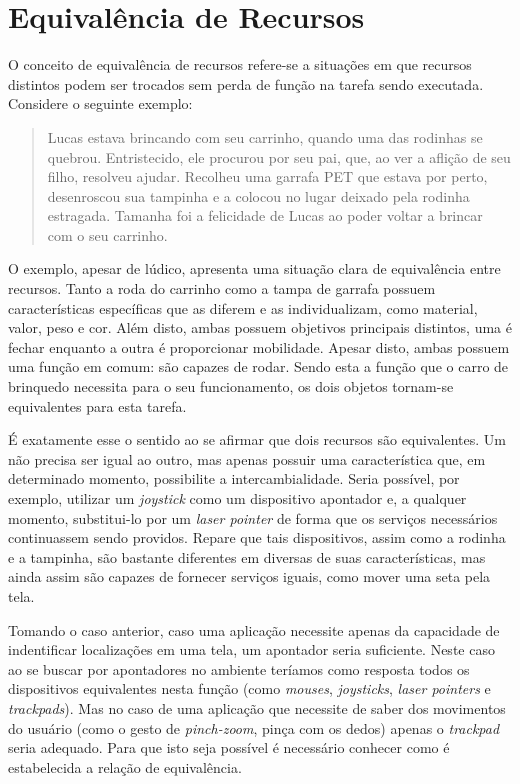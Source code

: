 \section{Equivalência de Recursos}
\label{sec:equivalenciaRecursos}

O conceito de equivalência de recursos refere-se a situações em que recursos distintos podem ser trocados sem perda de função na tarefa sendo executada. Considere o seguinte exemplo:

\begin{quote}
	Lucas estava brincando com seu carrinho, quando uma das rodinhas se quebrou. Entristecido, ele procurou por seu pai, que, ao ver a aflição de seu filho, resolveu ajudar. Recolheu uma garrafa PET que estava por perto, desenroscou sua tampinha e a colocou no lugar deixado pela rodinha estragada. Tamanha foi a felicidade de Lucas ao poder voltar a brincar com o seu carrinho.
\end{quote}

O exemplo, apesar de lúdico, apresenta uma situação clara de equivalência entre recursos. Tanto a roda do carrinho como a tampa de garrafa possuem características específicas que as diferem e as individualizam, como material, valor, peso e cor. Além disto, ambas possuem objetivos principais distintos, uma é fechar enquanto a outra é proporcionar mobilidade. Apesar disto, ambas possuem uma função em comum: são capazes de rodar. Sendo esta a função que o carro de brinquedo necessita para o seu funcionamento, os dois objetos tornam-se equivalentes para esta tarefa.

É exatamente esse o sentido ao se afirmar que dois recursos são equivalentes. Um não precisa ser igual ao outro, mas apenas possuir uma característica que, em determinado momento, possibilite a intercambialidade. Seria possível, por exemplo, utilizar um \emph{joystick} como um dispositivo apontador e, a qualquer momento, substitui-lo por um \emph{laser pointer} de forma que os serviços necessários continuassem sendo providos. Repare que tais dispositivos, assim como a rodinha e a tampinha, são bastante diferentes em diversas de suas características, mas ainda assim são capazes de fornecer serviços iguais, como mover uma seta pela tela.

Tomando o caso anterior, caso uma aplicação necessite apenas da capacidade de indentificar localizações em uma tela, um apontador seria suficiente. Neste caso ao se buscar por apontadores no ambiente teríamos como resposta todos os dispositivos equivalentes nesta função (como \emph{mouses}, \emph{joysticks}, \emph{laser pointers} e \emph{trackpads}). Mas no caso de uma aplicação que necessite de saber dos movimentos do usuário (como o gesto de \emph{pinch-zoom}, pinça com os dedos) apenas o \emph{trackpad} seria adequado. Para que isto seja possível é necessário conhecer como é estabelecida a relação de equivalência.

